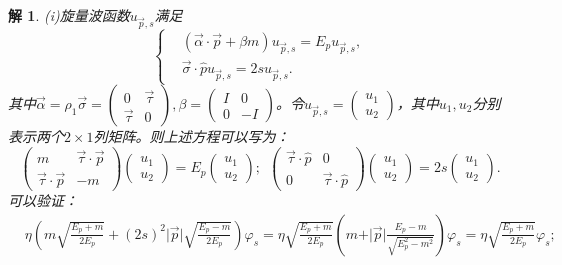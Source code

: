 \documentclass[UTF8,10pt,a4paper]{article}
\theoremstyle{Problem}%
\theoremstyle{Solution}%
\newtheorem*{sol}{解}%
\begin{document}
\begin{sol}
(i)旋量波函数$u_{\vec{p},s}$满足
\[
    \left\{ \begin{aligned}
    &(\vec{\alpha} \cdot \vec{p} + \beta m) u_{\vec{p},s} = E_p u_{\vec{p},s}, \\
    &\vec{\sigma} \cdot \hat{p} u_{\vec{p},s} = 2s u_{\vec{p},s}.
    \end{aligned} \right.
\]
其中$\vec{\alpha} = \rho_1 \vec{\sigma} = \begin{pmatrix}
    0 & \vec{\tau} \\
    \vec{\tau} & 0
\end{pmatrix}, \beta = \begin{pmatrix}
    I & 0 \\
    0 & -I
\end{pmatrix}$。令$u_{\vec{p},s} = \begin{pmatrix}
    u_1 \\
    u_2
\end{pmatrix}$，其中$u_1,u_2$分别表示两个$2\times 1$列矩阵。则上述方程可以写为：
\[
    \begin{pmatrix}
        m & \vec{\tau} \cdot \vec{p} \\
        \vec{\tau} \cdot \vec{p} & -m
    \end{pmatrix}
    \begin{pmatrix}
        u_1 \\
        u_2
    \end{pmatrix} = 
    E_p \begin{pmatrix}
        u_1 \\
        u_2
    \end{pmatrix}; 
    ~~ 
    \begin{pmatrix}
        \vec{\tau}\cdot\hat{p} & 0 \\
        0 & \vec{\tau}\cdot\hat{p}
    \end{pmatrix}
    \begin{pmatrix}
        u_1 \\
        u_2
    \end{pmatrix} = 
    2s\begin{pmatrix}
        u_1 \\
        u_2
    \end{pmatrix}.
\]
可以验证：
\[
    \begin{aligned}
    &\eta \left( m\sqrt{\frac{E_p+m}{2E_p}} + (2s)^2 \vert \vec{p} \vert \sqrt{\frac{E_p-m}{2E_p}} \right)\varphi_s = \eta \sqrt{\frac{E_p+m}{2E_p}} \left( m + \vert \vec{p} \vert \frac{E_p-m}{\sqrt{E_p^2 - m^2}} \right) \varphi_s = \eta \sqrt{\frac{E_p+m}{2E_p}}\varphi_s; \\

\end{aligned}\]
\end{sol}
\end{document}

